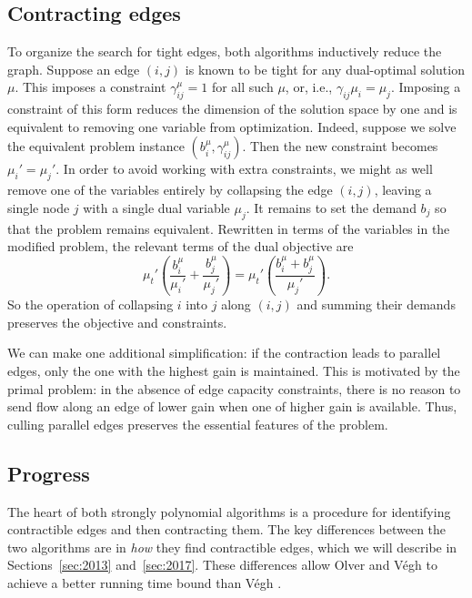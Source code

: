 \documentclass[11pt]{article}
\theoremstyle{definition}
\theoremstyle{definition}
\theoremstyle{definition}
\newcommand{\biu}{b_{i}^{\mu}}
\newcommand{\gij}{\gamma_{ij}}
\newcommand{\giij}{\gamma_{ij}^{\mu}}
\begin{document}
    \subsection{Contracting edges}\label{sec:contract}
    To organize the search for tight edges, both algorithms inductively reduce the graph.
    Suppose an edge $(i, j)$ is known to be tight for any dual-optimal solution $\mu$. This
    imposes a constraint $\giij = 1$ for all such $\mu$, or, i.e., $\gij \mu_i = \mu_j$.
    Imposing a constraint of this form reduces the dimension of the solution
    space by one and is equivalent to removing one variable from optimization. Indeed,
    suppose we solve the equivalent problem instance $(\biu, \giij)$. Then the new constraint
    becomes $\mu_i' = \mu_j'$. In order to avoid working with extra constraints, we might
    as well remove one of the variables entirely by collapsing the edge $(i, j)$, leaving a single
    node $j$ with a single dual variable $\mu_j$. It remains to set the demand $b_j$ so
    that the problem remains equivalent. Rewritten in terms of the variables in
    the modified problem, the relevant terms of the dual objective are
    \[ \mu_t' \left(\frac{b_i^\mu}{\mu_i'} + \frac{b_j^\mu}{\mu_j'}\right)
     = \mu_t' \left(\frac{b_i^\mu + b_j^\mu}{\mu_j'}\right). \]
	So the operation of collapsing $i$ into $j$ along $(i, j)$ and summing their demands
	preserves the objective and constraints.
	
	We can make one additional simplification: if the contraction leads to parallel edges,
	only the one with the highest gain is maintained. This is motivated by the primal problem: in
	the absence of edge capacity constraints, there is no reason to send flow along an edge of
	lower gain when one of higher gain is available. Thus, culling parallel edges preserves the
	essential features of the problem.
	
	\subsection{Progress} \label{sec:progress}

	The heart of both strongly polynomial algorithms is a procedure for
	identifying contractible edges and then contracting them. The key
	differences between the two algorithms are in 
	\textit{how} they find contractible edges, which
	we will describe in Sections~\ref{sec:2013} and~\ref{sec:2017}. These differences
	allow Olver and Végh \cite{Olver2017} to achieve a better running time bound than
	Végh \cite{Vegh2013}.
\end{document}
